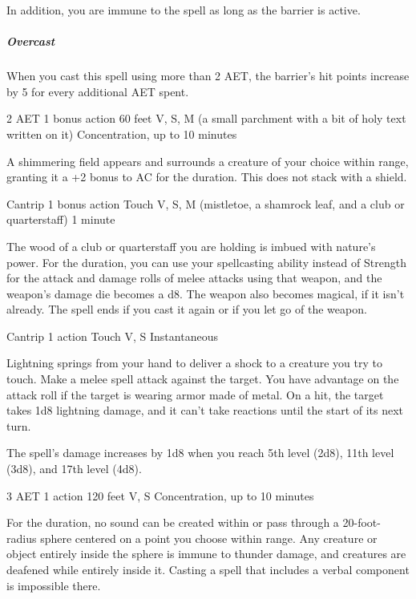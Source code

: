 In addition, you are immune to the  spell as long as the barrier is active.

\subparagraph*{Overcast} When you cast this spell using more than 2 AET, the barrier's hit points increase by 5 for every additional AET spent.


{2 AET}
{1 bonus action}
{60 feet}
{V, S, M (a small parchment with a bit of holy text written on it)}
{Concentration, up to 10 minutes}

A shimmering field appears and surrounds a creature of your choice within range, granting it a +2 bonus to AC for the duration. This does not stack with a shield.


{Cantrip}
{1 bonus action}
{Touch}
{V, S, M (mistletoe, a shamrock leaf, and a club or quarterstaff)}
{1 minute}

The wood of a club or quarterstaff you are holding is imbued with nature's power. For the duration, you can use your spellcasting ability instead of Strength for the attack and damage rolls of melee attacks using that weapon, and the weapon's damage die becomes a d8. The weapon also becomes magical, if it isn't already. The spell ends if you cast it again or if you let go of the weapon.


{Cantrip}
{1 action}
{Touch}
{V, S}
{Instantaneous}

Lightning springs from your hand to deliver a shock to a creature you try to touch. Make a melee spell attack against the target. You have advantage on the attack roll if the target is wearing armor made of metal. On a hit, the target takes 1d8 lightning damage, and it can't take reactions until the start of its next turn.

The spell's damage increases by 1d8 when you reach 5th level (2d8), 11th level (3d8), and 17th level (4d8).


{3 AET}
{1 action}
{120 feet}
{V, S}
{Concentration, up to 10 minutes}

For the duration, no sound can be created within or pass through a 20-foot-radius sphere centered on a point you choose within range. Any creature or object entirely inside the sphere is immune to thunder damage, and creatures are deafened while entirely inside it. Casting a spell that includes a verbal component is impossible there.


